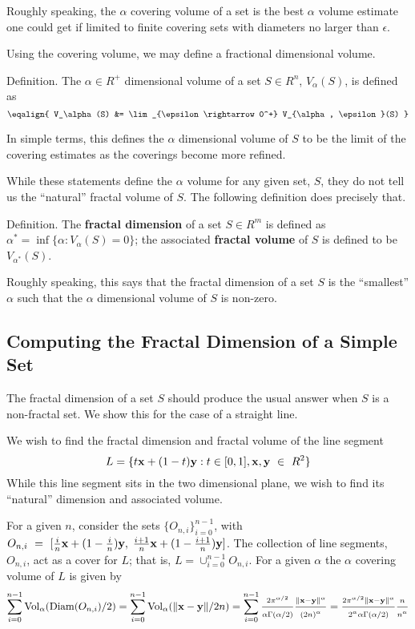 Roughly speaking, the $\alpha$ covering volume of a set is the best $\alpha$ volume 
estimate one could get if limited to finite covering sets with diameters no larger than $\epsilon$.

Using the covering volume, we may define a fractional dimensional volume.

\proclaim Definition. The $\alpha \in R^+$ dimensional volume of a set
$S \in R^n$, $V_\alpha(S)$,
is defined as
$$
\eqalign{
V_\alpha(S) &= \lim_{\epsilon \rightarrow 0^+} V_{\alpha, \epsilon}(S)
}
$$

 In simple terms, this defines the $\alpha$ dimensional volume of $S$
to be the limit of the covering estimates as the coverings become more refined.

While these statements define the $\alpha$ volume for any given set, $S$,
they do not tell us the ``natural'' fractal volume of $S$.
 The following definition does precisely that.

\proclaim Definition. The {\bf fractal dimension} of a 
set $S \in R^m$ is defined as
$\alpha^* = \inf\{\alpha : V_\alpha(S) = 0 \}$; the associated 
{\bf fractal volume} of $S$ is defined to be $V_{\alpha^*}(S)$.

Roughly speaking, this says that the fractal dimension of a set $S$ is the
``smallest'' $\alpha$ such that the $\alpha$ dimensional volume of $S$ is non-zero.

\subsection{Computing the Fractal Dimension of a Simple Set}

The fractal dimension of a set $S$ should produce the usual
answer when $S$ is a non-fractal set. We show this for the case of a
straight line.

We wish to find the fractal dimension and fractal volume of the line
segment 
$$
L = \{t{\bf x} + (1-t){\bf y} : t \in [0,1] , {\bf x, y}~\in~R^2\}
$$
While this line segment sits in the two dimensional plane, we wish 
to find its ``natural'' dimension and associated volume.

For a given $n$, consider the sets $\{O_{n,i}\}_{i=0}^{n-1}$, with $O_{n,i}~=~
[\frac{i}{n}{\bf x} + (1-\frac{i}{n}){\bf y}, \; \frac{i+1}{n}{\bf x} + (1 -
\frac{i+1}{n}){\bf y}]$. The collection of line segments, $O_{n,i}$, act
as a cover for $L$; that is, $L =
\cup_{i=0}^{n-1} O_{n,i}$. For a given $\alpha$ the
$\alpha$ covering volume of $L$ is given by
$$
\sum_{i=0}^{n-1} {\rm Vol}_\alpha({\rm Diam}(O_{n,i})/2) = \sum_{i=0}^{n-1}
{\rm Vol}_\alpha(\|{\bf x} - {\bf y}\|/2n) =  \sum_{i=0}^{n-1} \frac{2
\pi^{\alpha / 2}}{\alpha \Gamma(\alpha / 2)} \frac{\|{\bf x} - {\bf
y}\|^\alpha}{(2n)^\alpha} = \frac{2 \pi^{\alpha / 2} \|{\bf x} - {\bf
y}\|^\alpha}{2^\alpha \alpha \Gamma(\alpha / 2)} \frac{n}{n^\alpha}
$$

